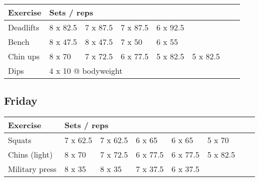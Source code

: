 \documentclass[12pt, a4paper]{article}%
\begin{document}
  \begin{tabular}{l|lllllll}
  \hspace{0.75em} \textbf{Exercise} & \multicolumn{ 7 }{l}{ \textbf{Sets / reps} } \\ \hline

            \hspace{0.75em} Deadlifts
            & 8 x 82.5
            & 7 x 87.5
            & 7 x 87.5
            & 6 x 92.5
            & 
            & 
            & 
            \\


            \hspace{0.75em} Bench
            & 8 x 47.5
            & 8 x 47.5
            & 7 x 50
            & 6 x 55
            & 
            & 
            & 
            \\


            \hspace{0.75em} Chin ups
            & 8 x 70
            & 7 x 72.5
            & 6 x 77.5
            & 5 x 82.5
            & 5 x 82.5
            & 
            & 
            \\


   \hspace{0.75em} Dips &  \multicolumn{ 7 }{l}{ 4 x 10 @ bodyweight } \\
  \end{tabular}

  \subsection*{\hspace{0.5em} Friday }


  \begin{tabular}{l|lllllll}
  \hspace{0.75em} \textbf{Exercise} & \multicolumn{ 7 }{l}{ \textbf{Sets / reps} } \\ \hline

            \hspace{0.75em} Squats
            & 7 x 62.5
            & 7 x 62.5
            & 6 x 65
            & 6 x 65
            & 5 x 70
            & 
            & 
            \\


            \hspace{0.75em} Chins (light)
            & 8 x 70
            & 7 x 72.5
            & 6 x 77.5
            & 6 x 77.5
            & 5 x 82.5
            & 
            & 
            \\


            \hspace{0.75em} Military press
            & 8 x 35
            & 8 x 35
            & 7 x 37.5
            & 6 x 37.5
            & 
            & 
            & 
            \\


  \end{tabular}
\end{document}
